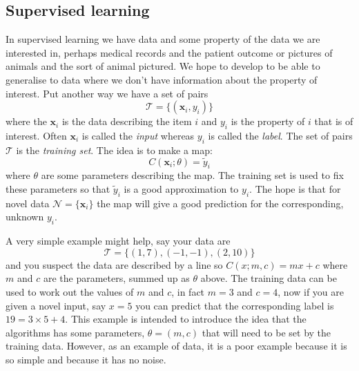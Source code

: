 \documentclass[12pt]{article}
\begin{document}
\subsection{Supervised learning}

In supervised learning we have data and some property of the data we
are interested in, perhaps medical records and the patient outcome or
pictures of animals and the sort of animal pictured. We hope to
develop to be able to generalise to data where we don't have information about the
property of interest. Put another way we have a set of pairs
\begin{equation}
  \mathcal{T}=\{(\mathbf{x}_i,y_i)\}
\end{equation}
where the $\mathbf{x}_i$ is the data describing the item $i$ and $y_i$
is the property of $i$ that is of interest. Often $\mathbf{x}_i$ is
called the \textsl{input} whereas $y_i$ is called the
\textsl{label}. The set of pairs $\mathcal{T}$ is the \textsl{training
  set}. The idea is to make a map:
\begin{equation}
  C(\mathbf{x}_i;\theta)=\tilde{y}_i
\end{equation}
where $\theta$ are some parameters describing the map. The training
set is used to fix these parameters so that $\tilde{y}_i$ is a good
approximation to $y_i$. The hope is that for novel data
$\mathcal{N}=\{\mathbf{x}_i\}$ the map will give a good prediction
for the corresponding, unknown $y_i$.

A very simple example might help, say your data are
\begin{equation}
  \mathcal{T}=\{(1,7),(-1,-1),(2,10)\}
\end{equation}
and you suspect the data are described by a line so $C(x;m,c)=mx+c$
where $m$ and $c$ are the parameters, summed up as $\theta$ above. The
training data can be used to work out the values of $m$ and $c$, in
fact $m=3$ and $c=4$, now if you are given a novel input, say $x=5$
you can predict that the corresponding label is $19=3\times 5+4$. This
example is intended to introduce the idea that the algorithms has some
parameters, $\theta=(m,c)$ that will need to be set by the training
data. However, as an example of data, it is a poor example because it
is so simple and because it has no noise.
\end{document}
